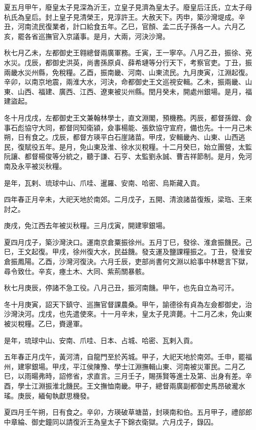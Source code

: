 \begin{pinyinscope}
夏五月甲午，廢皇太子見深為沂王，立皇子見濟為皇太子。廢皇后汪氏，立太子母杭氏為皇后。封上皇子見清榮王，見淳許王。大赦天下。丙申，築沙灣堤成。辛丑，河南流民復業者，計口給食五年。乙巳，官顏、孟二氏子孫各一人。六月乙亥，罷各省巡撫官入京議事。是月，大兩，河決沙灣。

秋七月乙未，左都御史王翱總督兩廣軍務。壬寅，王一寧卒。八月乙丑，振徐、兗水災。戊辰，都御史洪英，尚書孫原貞、薛希璉等分行天下，考察官吏。丁丑，振兩畿水災州縣，免稅糧。乙酉，振南畿、河南、山東流民。九月庚寅，江淵起復。辛卯，以南京地震，兩淮大水，河決，命都御史王文巡視安輯。乙未，振兩畿、山東、山西、福建、廣西、江西、遼東被災州縣。閏月癸未，開處州銀場。是月，福建盜起。

冬十月戊戌，左都御史王文兼翰林學士，直文淵閣，預機務。丙辰，都督孫鏜、僉事石彪協守大同，都督同知衛潁，僉事楊能、張欽協守宣府，備也先。十一月己未朔，日有食之。戊辰，都督方瑛平白石崖諸苗。甲戌，安輯畿內、山東、山西逃民，復賦役五年。是月，免山東及淮、徐水災稅糧。十二月癸巳，始立團營，太監阮讓、都督楊俊等分統之，聽于謙、石亨、太監劉永誠、曹吉祥節制。是月，免河南及永平被災秋糧。

是年，瓦剌、琉球中山、爪哇、暹羅、安南、哈密、烏斯藏入貢。

四年春正月辛未，大祀天地於南郊。二月戊子，五開、清浪諸苗復叛，梁珤、王來討之。

庚戌，免江西去年被災秋糧。三月戊寅，開建寧銀場。

夏四月戊子，築沙灣決口。運南京倉粟振徐州。五月丁巳，發徐、淮倉振饑民。己巳，王文起復。甲戌，徐州復大水，民益饑。發支運及鹽課糧振之。丁丑，發淮安倉振鳳陽。乙酉，沙灣河復決。六月壬辰，吏部尚書何文淵以給事中林聰言下獄，尋令致仕。辛亥，瘞土木、大同、紫荊關暴骸。

秋七月庚辰，停諸不急工役。八月己丑，振河南饑。甲午，也先自立為可汗。

冬十月庚寅，詔天下鎮守、巡撫官督課農桑。甲午，諭德徐有貞為左僉都御史，治沙灣決河。戊戌，也先遣使來。十一月辛未，皇太子見濟薨。十二月乙未，免山東被災稅糧。乙巳，賚邊軍。

是年，琉球中山、安南、爪哇、日本、占城、哈密、瓦剌入貢。

五年春正月戊午，黃河清，自龍門至於芮城。甲子，大祀天地於南郊。壬申，罷福州，建寧銀場。甲戌，平江侯陳豫、學士江淵撫輯山東、河南被災軍民。二月乙巳，以雨暘弗時，詔修省，求直言。三月壬子，賜孫賢等進士及第、出身有差。辛酉，學士江淵振淮北饑民。王文撫恤南畿。甲子，總督兩廣副都御史馬昂破瀧水瑤。庚辰，緬甸執獻思機發。

夏四月壬午朔，日有食之。辛卯，方瑛破草塘苗，封瑛南和伯。五月甲子，禮部郎中章綸、御史鐘同以請復沂王為皇太子下錦衣衛獄。六月戊子，錄囚。


\end{pinyinscope}
